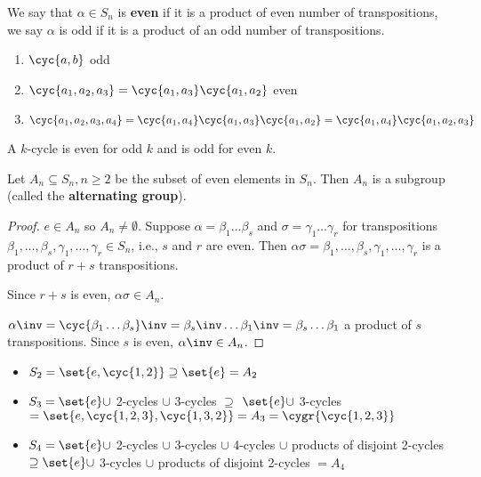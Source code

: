 \begin{definition}[parity]
    We say that $\alpha \in S_n$ is \textbf{even} if it is a product of even number of transpositions, we say $\alpha$ is odd if it is a product of an odd number of transpositions.
\end{definition}

\begin{example}
    \spacebeforelist
    \begin{enumerate}
        \item $\cyc{a,b}$ odd
        \item $\cyc{a_1,a_2,a_3} = \cyc{a_1,a_3}\cyc{a_1,a_2}$ even
        \item $\cyc{a_1,a_2,a_3,a_4} = \cyc{a_1,a_4}\cyc{a_1,a_3}\cyc{a_1,a_2} = \cyc{a_1,a_4}\cyc{a_1,a_2,a_3}$
    \end{enumerate}
\end{example}

\begin{remark}
    A $k$-cycle is even for odd $k$ and is odd for even $k$.
\end{remark}

\begin{theorem}
    Let $A_n \subseteq S_n, n \geq 2$ be the subset of even elements in $S_n$. Then $A_n$ is a subgroup (called the \textbf{alternating group}).
\end{theorem}
\begin{proof}
    $e \in A_n$ so $A_n \neq \emptyset$. Suppose $\alpha = \beta_1 \dots \beta_s$ and $\sigma = \gamma_1 \dots \gamma_r$ for transpositions $\beta_1,\dots,\beta_s,\gamma_1,\dots,\gamma_r \in S_n$, i.e., $s$ and $r$ are even. Then $\alpha\sigma = \beta_1,\dots,\beta_s,\gamma_1,\dots,\gamma_r$ is a product of $r + s$ transpositions.

    Since $r + s$ is even, $\alpha \sigma \in A_n$.

    $\alpha\inv = \cyc{\beta_1 \dots \beta_s}\inv = \beta_s\inv \dots \beta_1\inv = \beta_s \dots \beta_1$ a product of $s$ transpositions. Since $s$ is even, $\alpha\inv \in A_n$.
\end{proof}

\begin{example}
    \spacebeforelist
    \begin{itemize}
        \item $S_2 = \set{e, \cyc{1,2}} \supseteq \set{e} = A_2$
        \item $S_3 = \set{e} \cup$ 2-cycles $\cup$ 3-cycles $\supseteq$ $\set{e} \cup$ 3-cycles $ = \set{e, \cyc{1,2,3}, \cyc{1,3,2}} = A_3 = \cygr{\cyc{1,2,3}}$
        \item $S_4 = \set{e} \cup$ 2-cycles $\cup$ 3-cycles $\cup$ 4-cycles $\cup$ products of disjoint 2-cycles $\supseteq \set{e} \cup$ 3-cycles $\cup$ products of disjoint 2-cycles $ = A_4$
    \end{itemize}
\end{example}

